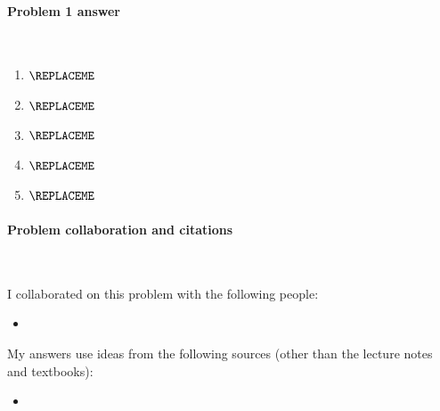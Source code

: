 

\paragraph{Problem 1 answer}~

\begin{blue}

  \begin{enumerate}[label=(\alph*)]

  \item  %

    $\REPLACEME$
    
  \item  %

    $\REPLACEME$

  \item  %

    $\REPLACEME$
    
  \item %

    $\REPLACEME$
    
  \item %

    $\REPLACEME$

  \end{enumerate}

\end{blue}

\vfill

\paragraph{Problem  collaboration and citations}~

I collaborated on this problem with the following people:
\begin{blue}
  \begin{itemize}
  \item \REPLACEME                    %
  \end{itemize}
\end{blue}

My answers use ideas from the following sources (other than the lecture notes and textbooks): 
\begin{blue}
  \begin{itemize}
  \item \REPLACEME                    %
  \end{itemize}
\end{blue}


